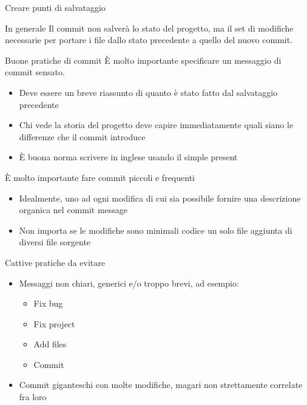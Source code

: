 \documentclass[presentation]{beamer}
\begin{document}
\begin{frame}{Creare punti di salvataggio}
\begin{block}{In generale}
		Il commit non salverà lo stato del progetto, ma il set di modifiche necessarie per portare i 
file dallo stato precedente a quello del nuovo commit.
	\end{block}
	\begin{block}{Buone pratiche di commit}
		È molto importante specificare un messaggio di commit sensato.
		\begin{itemize}
			\item Deve essere un breve riassunto di quanto è stato fatto dal salvataggio precedente
			\item Chi vede la storia del progetto deve capire immediatamente quali siano le 
differenze che il commit introduce
			\item È buona norma scrivere in inglese usando il simple present
		\end{itemize}
		È molto importante fare commit piccoli e frequenti
		\begin{itemize}
			\item Idealmente, uno ad ogni modifica di cui sia possibile fornire una descrizione 
organica nel commit message
			\item Non importa se le modifiche sono minimali
codice
un solo file
aggiunta di diversi file sorgente
		\end{itemize}
	\end{block}
	\begin{block}{Cattive pratiche da evitare}
		\begin{itemize}
			\item Messaggi non chiari, generici e/o troppo brevi, ad esempio:
			\begin{itemize}
				\item Fix bug
				\item Fix project
				\item Add files
				\item Commit
			\end{itemize}
			\item Commit giganteschi con molte modifiche, magari non strettamente correlate fra loro

\end{itemize}
\end{block}
\end{frame}
\end{document}
